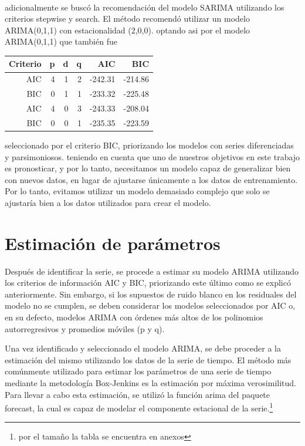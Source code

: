 \documentclass[11pt]{article}
\begin{document}
\begin{minipage}{0.5\textwidth}
\begin{flushleft}
~\\adicionalmente se buscó la recomendación del modelo SARIMA utilizando los criterios stepwise y search. El método recomendó utilizar un modelo ARIMA(0,1,1) con estacionalidad (2,0,0). optando asi por el modelo ARIMA(0,1,1) que también fue
\end{flushleft}
\end{minipage}
\hfill
\begin{minipage}{0.5\textwidth}
    \centering
    \begin{tabular}{rrrrrr}
    \hline  Criterio & p & d & q & AIC & BIC \\ 
    \hline
    AIC & 4 & 1 & 2 & -242.31 & -214.86 \\ 
    BIC & 0 & 1 & 1 & -233.32 & -225.48 \\ 
    AIC & 4 & 0 & 3 & -243.33 & -208.04 \\ 
    BIC & 0 & 0 & 1 & -235.35 & -223.59 \\ 
    \hline
    \end{tabular}
\end{minipage}

seleccionado por el criterio BIC, priorizando los modelos con series diferenciadas y parsimoniosos. teniendo en cuenta que uno de nuestros objetivos en este trabajo es pronosticar, y por lo tanto, necesitamos un modelo capaz de generalizar bien con nuevos datos, en lugar de ajustarse únicamente a los datos de entrenamiento. Por lo tanto, evitamos utilizar un modelo demasiado complejo que solo se ajustaría bien a los datos utilizados para crear el modelo.

\section{Estimación de parámetros}
Después de identificar la serie, se procede a estimar su modelo ARIMA utilizando los criterios de información AIC y BIC, priorizando este último como se explicó anteriormente. Sin embargo, si los supuestos de ruido blanco en los residuales del modelo no se cumplen, se deben considerar los modelos seleccionados por AIC o, en su defecto, modelos ARIMA con órdenes más altos de los polinomios autorregresivos y promedios móviles (p y q).

Una vez identificado y seleccionado el modelo ARIMA, se debe proceder a la estimación del mismo utilizando los datos de la serie de tiempo. El método más comúnmente utilizado para estimar los parámetros de una serie de tiempo mediante la metodología Box-Jenkins es la estimación por máxima verosimilitud. Para llevar a cabo esta estimación, se utilizó la función arima del paquete forecast, la cual es capaz de modelar el componente estacional de la serie.\footnote{por el tamaño la tabla se encuentra en anexos}
\end{document}
